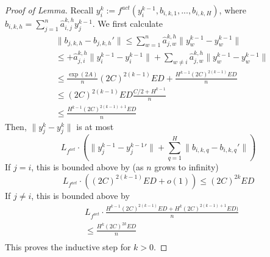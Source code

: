\documentclass[11pt,a4paper]{article}
\begin{document}
\begin{proof}[Proof of Lemma]
Recall $y_i^k := f^{act}(y_i^{k-1}, b_{i,k,1}, ..., b_{i,k,H})$, where $b_{i,k,h} = \sum_{j=1}^n \hat{a}_{i,j}^{k,h} y_j^{k-1}$.
We first calculate
\begin{align*}
& \|b_{j,k,h} - b_{j,k,h}'\|  \leq \sum_{w=1}^n \hat{a}_{j,w}^{k,h} \|y_w^{k-1} - y_w^{k-1}\| \\
& \leq + \hat{a}_{j,i}^{k,h} \|y_i^{k-1} - y_i^{k-1}\|  + \sum_{w \neq i} \hat{a}_{j,w}^{k,h} \|y_w^{k-1} - y_w^{k-1}\|  \\
& \leq \frac{\exp(2A)}{n}  (2C)^{2(k-1)} ED + \frac{H^{k-1}(2C)^{2(k-1)}ED}{n} \\
& \leq (2C)^{2(k-1)}ED \frac{C/2   + H^{k-1} }{n} \\
& \leq \frac{H^{k-1} (2C)^{2(k-1)+1} ED}{n}
\end{align*}
Then, $\|y_j^k - {y_j^k}\|$ is at most
\begin{equation}
	L_{f^{act}} \cdot \left(\|y_j^{k-1}-{y_j^{k-1}}'\| + \sum_{q=1}^H \|b_{i,k,q} - b_{i,k,q}'\|\right)
\end{equation}
If $j= i$, this is bounded above by (as $n$ grows to infinity)
\begin{equation}
L_{f^{act}} \cdot ((2C)^{2(k-1)}ED + o(1)) \leq (2C)^{2k}ED
\end{equation}
If $j\neq i$, this is bounded above by
\begin{align*}
  &  L_{f^{act}} \cdot \frac{H^{k-1} (2C)^{2(k-1)}ED + H^{k} (2C)^{2(k-1)+1} ED)}{n} \\
  &  \leq  \frac{H^{k} (2C)^{2k} ED}{n} \\
\end{align*} 
This proves the inductive step for $k>0$.
\end{proof}


\end{document}
